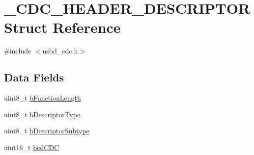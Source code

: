 \hypertarget{struct__CDC__HEADER__DESCRIPTOR}{\section{\-\_\-\-C\-D\-C\-\_\-\-H\-E\-A\-D\-E\-R\-\_\-\-D\-E\-S\-C\-R\-I\-P\-T\-O\-R Struct Reference}
\label{struct__CDC__HEADER__DESCRIPTOR}
}


{\ttfamily \#include $<$usbd\-\_\-cdc.\-h$>$}

\subsection*{Data Fields}
\begin{DoxyCompactItemize}
\item 
uint8\-\_\-t \hyperlink{struct__CDC__HEADER__DESCRIPTOR_a0b88951b1e043616876d35573a6d85ed}{b\-Function\-Length}
\item 
uint8\-\_\-t \hyperlink{struct__CDC__HEADER__DESCRIPTOR_acd21e37337cf4879585dfe4b13747b9c}{b\-Descriptor\-Type}
\item 
uint8\-\_\-t \hyperlink{struct__CDC__HEADER__DESCRIPTOR_a8023a40a5a8e7231ad509f2f1427e37b}{b\-Descriptor\-Subtype}
\item 
uint16\-\_\-t \hyperlink{struct__CDC__HEADER__DESCRIPTOR_a2650cd685ca91a2b3d3c046057287d46}{bcd\-C\-D\-C}
\end{DoxyCompactItemize}


